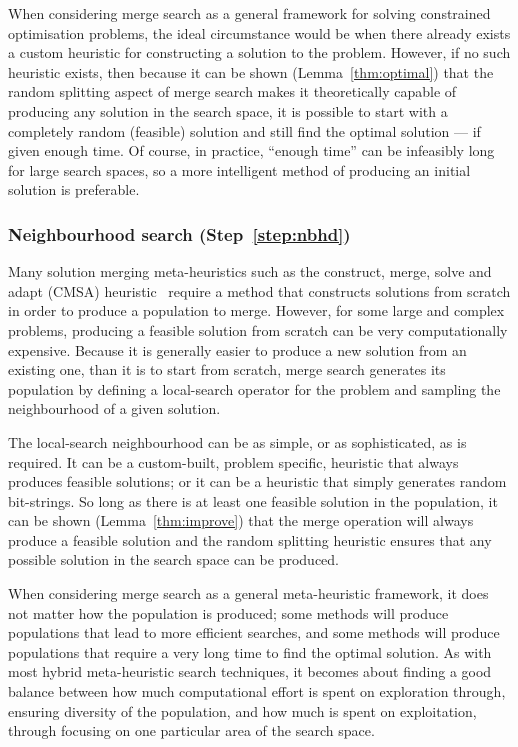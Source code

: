 \documentclass[journal]{IEEEtran}
\begin{document}
When considering merge search as a general framework for solving constrained optimisation problems, the ideal circumstance would be when there already exists a custom heuristic for constructing a solution to the problem. However, if no such heuristic exists, then because it can be shown (Lemma~\ref{thm:optimal}) that the random splitting aspect of merge search makes it theoretically capable of producing any solution in the search space, it is possible to start with a completely random (feasible) solution and still find the optimal solution --- if given enough time. Of course, in practice, ``enough time'' can be infeasibly long for large search spaces, so a more intelligent method of producing an initial solution is preferable.

\subsubsection*{\bf Neighbourhood search (Step~\ref{step:nbhd})}

Many solution merging meta-heuristics such as the construct, merge, solve and adapt (CMSA) heuristic~\cite{cmsa} require a method that constructs solutions from scratch in order to produce a population to merge. However, for some large and complex problems, producing a feasible solution from scratch can be very computationally expensive. Because it is generally easier to produce a new solution from an existing one, than it is to start from scratch, merge search generates its population by defining a local-search operator for the problem and sampling the neighbourhood of a given solution.

The local-search neighbourhood can be as simple, or as sophisticated, as is required. It can be a custom-built, problem specific, heuristic that always produces feasible solutions; or it can be a heuristic that simply generates random bit-strings. So long as there is at least one feasible solution in the population, it can be shown (Lemma~\ref{thm:improve}) that the merge operation will always produce a feasible solution and the random splitting heuristic ensures that any possible solution in the search space can be produced.

When considering merge search as a general meta-heuristic framework, it does not matter how the population is produced; some methods will produce populations that lead to more efficient searches, and some methods will produce populations that require a very long time to find the optimal solution. As with most hybrid meta-heuristic search techniques, it becomes about finding a good balance between how much computational effort is spent on exploration through, ensuring diversity of the population, and how much is spent on exploitation, through focusing on one particular area of the search space.
\end{document}
